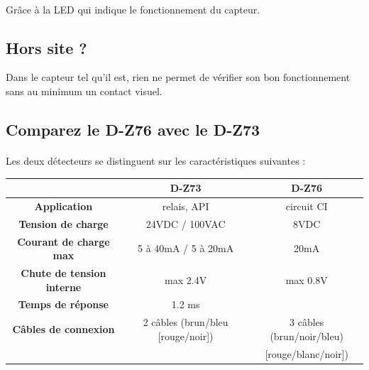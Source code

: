\documentclass{article}
\begin{document}
\paragraph{}
Grâce à la LED qui indique le fonctionnement du capteur.

\subsection{Hors site ?}
Dans le capteur tel qu'il est, rien ne permet de vérifier son bon fonctionnement sans au minimum un contact visuel.

\subsection{Comparez le D-Z76 avec le D-Z73}
\paragraph{}
Les deux détecteurs se distinguent sur les caractéristiques suivantes :

\begin{table}[H]
    \begin{center}
        \begin{tabular}{c c c}
            & \textbf{D-Z73} & \textbf{D-Z76} \\
            \hline
            \textbf{Application} & relais, API & circuit CI \\
            \hline
            \textbf{Tension de charge} & 24VDC / 100VAC & 8VDC\\
            \hline
            \textbf{Courant de charge max} & 5 à 40mA / 5 à 20mA & 20mA\\
            \hline
            \textbf{Chute de tension interne} & max 2.4V & max 0.8V\\
            \hline
            \textbf{Temps de réponse} & 1.2 ms\\
            \hline
            \textbf{Câbles de connexion} & 2 câbles (brun/bleu [rouge/noir]) & 3 câbles (brun/noir/bleu)\\
             &  & [rouge/blanc/noir])\\
        \end{tabular}
    \end{center}
\end{table}

\newpage
\end{document}
